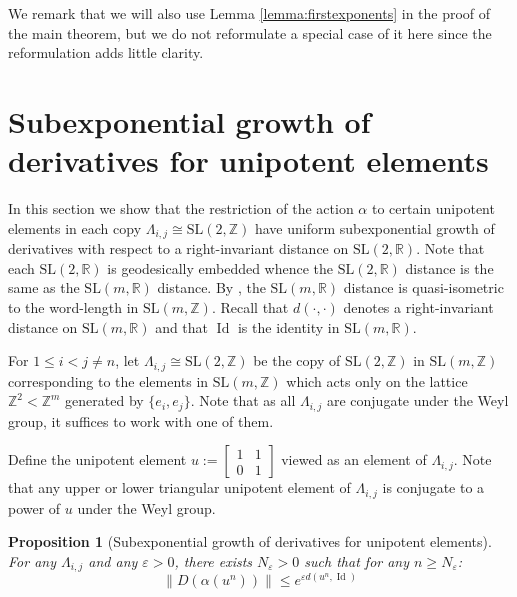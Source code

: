 \documentclass[10pt,reqno]{amsart}
\theoremstyle{Theorem}
\newtheorem{proposition}[theorem]{Proposition}
\theoremstyle{definition}
\theoremstyle{remark}
\newcommand{\noted}[1]{\marginpar{{\color{blue}\footnotesize \begin{spacing}{1}#1\end{spacing}}}}
\renewcommand{\epsilon}{\varepsilon}
\DeclareMathOperator{\Id}{Id}
\newcommand{\R}{\mathbb {R}}
\newcommand{\Z}{\mathbb {Z}}
\newcommand{\e}{\epsilon}
\newcommand{\Sl}{\mathrm{SL}}
\def\blue{}
\begin{document}
We remark that we will also use Lemma \ref{lemma:firstexponents} in the proof of the main theorem, but we do not reformulate a special case of it here since the reformulation adds little clarity.


\section{Subexponential growth of derivatives for unipotent elements}
\label{unipotents}

In this section we show that the restriction of the action $\alpha$ to certain unipotent elements in each copy  $\Lambda_{i,j} \cong \Sl(2, \Z)$ have  uniform  subexponential growth of   derivatives with respect to a right-invariant distance on $\Sl(2, \R)$.  Note that each $\Sl(2,\R)$ is geodesically embedded whence the   $\Sl(2,\R)$ distance is the same as  the $\Sl(m, \R)$ distance.  By  \cite{MR1244421, MR1828742},  the $\Sl(m,\R)$ distance is  quasi-isometric to the word-length in $\Sl(m,\Z)$.   Recall   that $d(\cdot,\cdot)$ denotes a right-invariant distance  on $\Sl(m, \R)$ and that $\Id$ is the identity in $\Sl(m,\R)$.

For $ 1\leq i < j \neq n$, let $\Lambda_{i,j} \cong \Sl(2, \Z)$ be the copy of $\Sl(2, \Z)$ in $\Sl(m,\Z)$ corresponding to the elements in $\Sl(m,\Z)$ which acts only on the lattice $\Z^2 < \Z^m$ generated by $\{e_i,e_j\}$.
Note that as all $\Lambda_{i,j}$ are conjugate under the Weyl group, it suffices to work with one of them.


Define the unipotent element $u := \begin{bmatrix} 1 & 1 \\ 0 & 1 \end{bmatrix}$ viewed as an element of $\Lambda_{i,j}$.  Note that any upper or  lower triangular unipotent element of $\Lambda_{i,j}$ is  conjugate to a power of $u$  under the Weyl group.

\begin{proposition}[Subexponential growth of derivatives for unipotent elements]
\label{unipotentisgood} For any $\Lambda_{i,j}$ and any $\e > 0$, there exists $N_{\e}>0$ such that for any $n \geq N_\e$: $$\|D(\alpha(u^n))\| \leq e^{\e d(u^n,\Id)}$$
\end{proposition}
\end{document}

